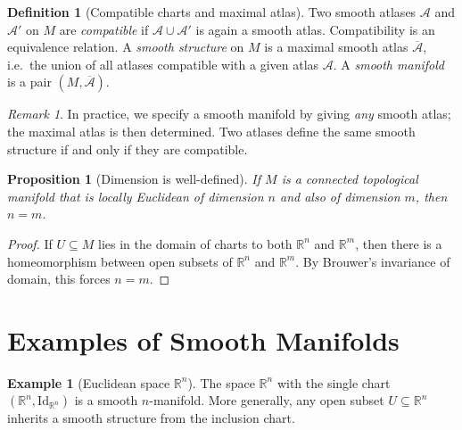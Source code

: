 \documentclass[12pt,a4paper,openany]{book}
\newtheorem{proposition}[theorem]{Proposition}
\theoremstyle{definition}
\newtheorem{definition}[theorem]{Definition}
\newtheorem{example}[theorem]{Example}
\theoremstyle{remark}
\newtheorem{remark}[theorem]{Remark}
\newcommand{\R}{\mathbb{R}}
\newcommand{\Id}{\mathrm{Id}}
\begin{document}
\begin{definition}[Compatible charts and maximal atlas]\label{def:maximal-atlas}
Two smooth atlases $\mathcal{A}$ and $\mathcal{A}'$ on $M$ are
\emph{compatible} if $\mathcal{A} \cup \mathcal{A}'$ is again a smooth
atlas.  Compatibility is an equivalence relation.  A \emph{smooth
structure} on $M$ is a maximal smooth atlas
$\overline{\mathcal{A}}$, i.e.\ the union of all atlases compatible with a
given atlas $\mathcal{A}$.  A \emph{smooth manifold}
is a pair $(M, \overline{\mathcal{A}})$.
\end{definition}

\begin{remark}\label{rem:determined-by-atlas}
In practice, we specify a smooth manifold by giving \emph{any} smooth atlas;
the maximal atlas is then determined.  Two atlases define the same smooth
structure if and only if they are compatible.
\end{remark}

\begin{proposition}[Dimension is well-defined]\label{prop:dim-well-defined}
If $M$ is a connected topological manifold that is locally Euclidean of
dimension $n$ and also of dimension $m$, then $n = m$.
\end{proposition}

\begin{proof}
If $U \subseteq M$ lies in the domain of charts to both $\R^n$ and $\R^m$,
then there is a homeomorphism between open subsets of $\R^n$ and $\R^m$.
By Brouwer's invariance of domain, this forces
$n = m$.
\end{proof}

\section{Examples of Smooth Manifolds}
\label{sec:examples-manifolds}

\begin{example}[Euclidean space $\R^n$]\label{ex:Rn}
The space $\R^n$ with the single chart $(\R^n, \Id_{\R^n})$ is a smooth
$n$-manifold.  More generally, any open subset $U \subseteq \R^n$ inherits
a smooth structure from the inclusion chart.
\end{example}
\end{document}
